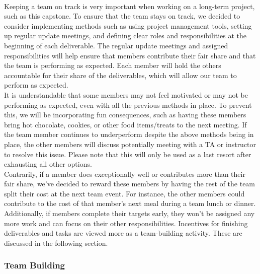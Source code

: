 \documentclass{article}
\begin{document}
 \\

Keeping a team on track is very important when working on a long-term project,
 such as this capstone. To ensure that the team stays on track, we decided to
 consider implementing methods such as using project management tools, setting
 up regular update meetings, and defining clear roles and responsibilities at
 the beginning of each deliverable. The regular update meetings and assigned
 responsibilities will help ensure that members contribute their fair share 
 and that the team is performing as expected. Each member will hold the others
 accountable for their share of the deliverables, which will allow our team 
 to perform as expected. \\

It is understandable that some members may not feel motivated or may not be
 performing as expected, even with all the previous methods in place.
 To prevent this, we will be incorporating fun consequences,
 such as having these members bring hot chocolate, cookies,
 or other food items/treats to the next meeting.
 If the team member continues to underperform despite the above
 methods being in place, the other members will discuss potentially 
 meeting with a TA or instructor to resolve this issue. 
 Please note that this will only be used as a last
 resort after exhausting all other options. \\

Contrarily, if a member does exceptionally well or contributes more 
than their fair share, we’ve decided to reward these members by having 
the rest of the team split their cost at the next team event. 
For instance, the other members could contribute to the cost of 
that member’s next meal during a team lunch or dinner. \\

Additionally, if members complete their targets early, 
they won’t be assigned any more work and can focus on 
their other responsibilities. 
Incentives for finishing deliverables and tasks are 
viewed more as a team-building activity. 
These are discussed in the following section. \\


\subsubsection*{Team Building}
\end{document}
